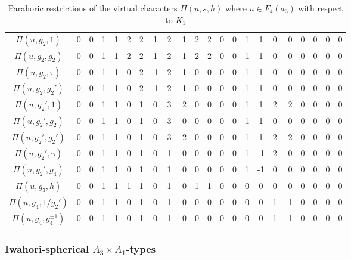 \begin{landscape}
\begin{table}[ht]
{\begin{tabular}{|c|ccccc|cccR|cccR|cccR|cccR|}
        $\Pi(u,g_2,1)$  & 0 & 0 & 1 & 1 & 2 & 2 & 1 & 2 & 1 & 2 & 2 & 0 & 0 & 1 & 1 & 0 & 0 & 0 & 0 & 0 & 0 \\
        $\Pi(u,g_2,g_2)$ & 0 & 0 & 1 & 1 & 2 & 2 & 1 & 2 & {-1} & 2 & 2 & 0 & 0 & 1 & 1 & 0 & 0 & 0 & 0 & 0 & 0 \\
        $\Pi(u,g_2,\tau)$ & 0 & 0 & 1 & 1 & 0 & 2 & {-1} & 2 & 1 & 0 & 0 & 0 & 0 & 1 & 1 & 0 & 0 & 0 & 0 & 0 & 0 \\
        $\Pi(u,g_2,g_2')$ & 0 & 0 & 1 & 1 & 0 & 2 & {-1} & 2 & {-1} & 0 & 0 & 0 & 0 & 1 & 1 & 0 & 0 & 0 & 0 & 0 & 0 \\\hline
        $\Pi(u,g_2',1)$ & 0 & 0 & 1 & 1 & 0 & 1 & 0 & {3} & 2 & 0 & 0 & 0 & 0 & 1 & 1 & 2 & 2 & 0 & 0 & 0 & 0 \\
        $\Pi(u,g_2',g_2)$ &  0 & 0 & 1 & 1 & 0 & 1 & 0 & {3} & 0 & 0 & 0 & 0 & 0 & 1 & 1 & 0 & 0 & 0 & 0 & 0 & 0 \\
        $\Pi(u,g_2',g_2')$ & 0 & 0 & 1 & 1 & 0 & 1 & 0 & {3} & {-2} & 0 & 0 & 0 & 0 & 1 & 1 & 2 & {-2} & 0 & 0 & 0 & 0 \\
        $\Pi(u,g_2',\gamma)$ & 0 & 0 & 1 & 1 & 0 & 1 & 0 & 1 & 0 & 0 & 0 & 0 & 0 & 1 & {-1} & 2 & 0 & 0 & 0 & 0 & 0 \\
        $\Pi(u,g_2',g_4)$ & 0 & 0 & 1 & 1 & 0 & 1 & 0 & 1 & 0 & 0 & 0 & 0 & 0 & 1 & {-1} & 0 & 0 & 0 & 0 & 0 & 0 \\\hline
        $\Pi(u,g_3,h)$ & 0 & 0 & 1 & 1 & 1 & 1 & 0 & 1 & 0 & 1 & 1 & 0 & 0 & 0 & 0 & 0 & 0 & 0 & 0 & 0 & 0 \\\hline
        $\Pi(u,g_4,1/g_2')$ & 0 & 0 & 1 & 1 & 0 & 1 & 0 & 1 & 0 & 0 & 0 & 0 & 0 & 0 & 0 & 1 & 1 & 0 & 0 & 0 & 0 \\
        $\Pi(u,g_4,g_4^{\pm1})$ & 0 & 0 & 1 & 1 & 0 & 1 & 0 & 1 & 0 & 0 & 0 & 0 & 0 & 0 & 0 & 1 & {-1} & 0 & 0 & 0 & 0 \\\hline
        \end{tabular}
        }
        \caption{Parahoric restrictions of the virtual characters $\Pi(u,s,h)$ where $u\in F_4(a_3)$ with respect to $K_1$}
    \end{table}

    \newpage

    \centering
    \subsubsection*{Iwahori-spherical \texorpdfstring{$A_3\times A_1$}{PDFstring}-types}


\end{landscape}
